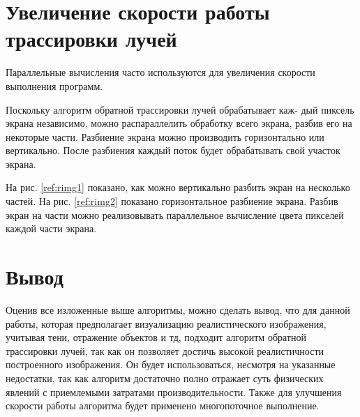 \section {Увеличение скорости работы трассировки лучей}

Параллельные вычисления часто используются для увеличения скорости выполнения программ.

Поскольку алгоритм обратной трассировки лучей обрабатывает каж-
дый пиксель экрана независимо, можно распараллелить обработку всего
экрана, разбив его на некоторые части.
Разбиение экрана можно производить горизонтально или вертикально.
После разбиения каждый поток будет обрабатывать свой участок экрана.

На рис. \ref{ref:rimg1} показано, как можно вертикально разбить экран на
несколько частей. На рис. \ref{ref:rimg2} показано горизонтальное разбиение экрана.
Разбив экран на части можно реализовывать параллельное вычисление цвета
пикселей каждой части экрана.

\begin{figure}[ht!]
\end{figure}

\begin{figure}[ht!]
\end{figure}

\newpage

\section {Вывод}

Оценив все изложенные выше алгоритмы, можно сделать вывод, что для данной работы,
которая предполагает визуализацию реалистического изображения, учитывая тени,
отражение объектов и тд, подходит алгоритм обратной трассировки лучей,
так как он позволяет достичь высокой реалистичности построенного изображения.
Он будет использоваться, несмотря на указанные недостатки, так как алгоритм достаточно
полно отражает суть физических явлений с приемлемыми затратами производительности.
Также для улучшения скорости работы алгоритма будет применено многопоточное выполнение.

